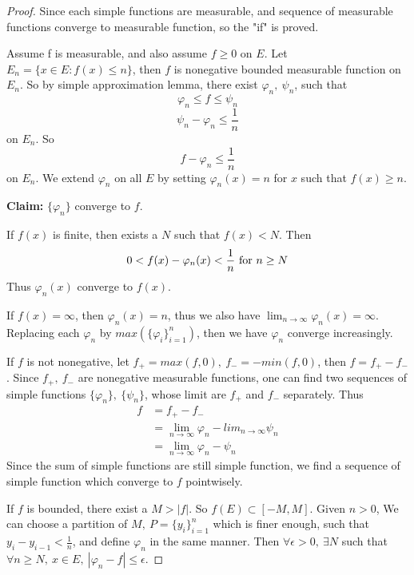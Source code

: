 \documentclass[lang=en, 12pt]{elegantbook}
\begin{document}
                \begin{proof}
                    Since each simple functions are measurable, and sequence of measurable functions converge to measurable function, so
                the "if" is proved. \par 
                    Assume f is measurable, and also assume $f\geq 0$ on $E$. Let $E_n = \{x \in E : f(x) \leq n\}$, then $f$ is nonegative bounded measurable function
                on $E_n$. So by simple approximation lemma, there exist $\varphi_n , \ \psi_n$, such that 
                $$\varphi_n \leq f \leq \psi_n$$
                $$\psi_n - \varphi_n \leq \frac{1}{n}$$ 
                on $E_n$. So 
                $$f - \varphi_n \leq \frac{1}{n}$$
                on $E_n$. We extend $\varphi_n$ on all $E$ by setting $\varphi_n(x) = n$ for $x$ such that $f(x) \geq n$.\par
                \textbf{Claim:} $\{\varphi_n\}$ converge to $f$. \par
                    If $f(x)$ is finite, then exists a $N$ such that $f(x) < N$. Then 
                    $$0< f(x) - \varphi_n(x) <\frac{1}{n} \mbox{ for $ n \geq N$}$$
                Thus $\varphi_n(x)$ converge to $f(x)$.\par
                    If $f(x) = \infty$, then $\varphi_n(x) = n$, thus we also have $\lim_{n\to \infty}\varphi_n(x) = \infty$.
                    Replacing each $\varphi_n$ by $max(\{\varphi_i\}_{i=1}^{n})$, then we have $\varphi_n$ converge increasingly.\par
                    If $f$ is not nonegative, let $f_+=max(f, 0), \ f_-= -min(f, 0)$, then $f = f_+ - f_-$. Since $f_+, \ f_-$ are nonegative 
                measurable functions, one can find two sequences of simple functions $\{\varphi_n\}, \ \{\psi_n\}$, whose limit are 
                $f_+$ and $f_-$ separately. Thus
                    \begin{equation}
                        \begin{aligned}
                            f &= f_+ - f_-\\
                            &= \lim_{n\to \infty} \varphi_n -lim_{n \to \infty} \psi_n\\
                            &= \lim_{n \to \infty} \varphi_n - \psi_n
                        \end{aligned}
                    \end{equation}
                    Since the sum of simple functions are still simple function, we find a sequence of simple function which converge to 
                $f$ pointwisely. \par
                    If $f$ is bounded, there exist a $M > |f|$. So $f(E) \subset [-M,M]$. Given $n>0$, We can choose a partition of $M, \ P=\{y_i\}_{i=1}^{n}$ 
                which is finer enough, such that $y_{i}-y_{i-1} <\frac{1}{n}$, and define $\varphi_n$ in the same manner. Then $\forall \epsilon > 0, \ \exists N$
                such that $\forall n \geq N, \ x \in E, \ |\varphi_n - f| \leq \epsilon$. 
                \end{proof}
        
\end{document}
